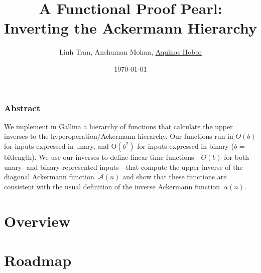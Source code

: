 \documentclass[10pt]{beamer}
\title[Inverting the Ackermann Hierarchy]{A Functional Proof Pearl: \protect\\ Inverting the Ackermann Hierarchy} %
\author{Linh Tran, Anshuman Mohan, \underline{Aquinas Hobor}} %
\institute[NUS] %
{
National University of Singapore %
}
\date{\today} %
\newcommand{\bigO}{\text{O}}
\newcommand{\Ack}{\ensuremath{\mathcal{A}}}
\begin{document}
\begin{frame}
\titlepage %
\end{frame}

\begin{frame}
\frametitle{Abstract}
We implement in Gallina a hierarchy of functions that calculate
the upper inverses to the hyperoperation/Ackermann hierarchy.
Our functions run in $\Theta(b)$ for inputs expressed
in unary, and $\bigO(b^2)$ for inputs expressed in binary ($b$ = bitlength).
We use our inverses to define linear-time functions---$\Theta(b)$ for both unary- 
and binary-represented inputs---that compute the upper inverse of the 
diagonal Ackermann %
function~$\Ack(n)$ and show that these functions are consistent with the usual definition of the inverse Ackermann function~$\alpha(n)$.
\end{frame}


\section*{Overview}
\label{sec: overview}


\section*{Roadmap}
\end{document}
